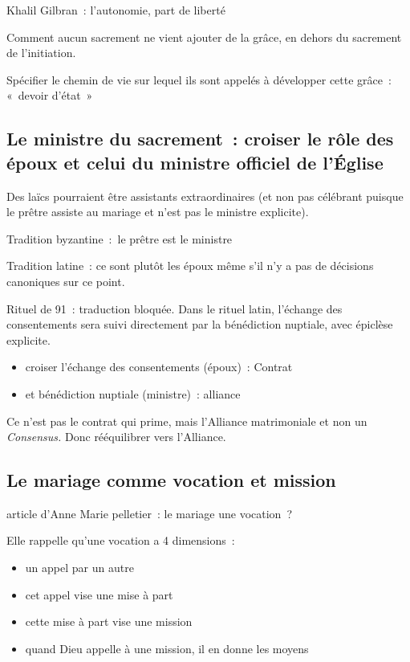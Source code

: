 Khalil Gilbran~: l'autonomie, part de liberté

Comment aucun sacrement ne vient ajouter de la grâce, en dehors du
sacrement de l'initiation.

Spécifier le chemin de vie sur lequel ils sont appelés à développer
cette grâce~: «~devoir d'état~»

 
\subsection{Le ministre du sacrement~: croiser le
rôle des époux et celui du ministre officiel de l'Église
} 

Des laïcs pourraient être assistants extraordinaires (et non pas
célébrant puisque le prêtre assiste au mariage et n'est pas le ministre
explicite).

Tradition byzantine~:~le prêtre est le ministre

Tradition latine~: ce sont plutôt les époux même s'il n'y a pas de
décisions canoniques sur ce point.

Rituel de 91~: traduction bloquée. Dans le rituel latin, l'échange des
consentements sera suivi directement par la bénédiction nuptiale, avec
épiclèse explicite.

\begin{itemize}
\item
  croiser l'échange des consentements (époux)~: Contrat
\item
  et bénédiction nuptiale (ministre)~: alliance
\end{itemize}

Ce n'est pas le contrat qui prime, mais l'Alliance matrimoniale et non
un \emph{Consensus.} Donc rééquilibrer vers l'Alliance.

\hypertarget{le-mariage-comme-vocation-et-mission}{%
\subsection{Le mariage comme vocation et
mission}\label{le-mariage-comme-vocation-et-mission}}

article d'Anne Marie pelletier~: le mariage une vocation~?

Elle rappelle qu'une vocation a 4 dimensions~:

\begin{itemize}
\item
  un appel par un autre
\item
  cet appel vise une mise à part
\item
  cette mise à part vise une mission
\item
  quand Dieu appelle à une mission, il en donne les moyens
\end{itemize}

